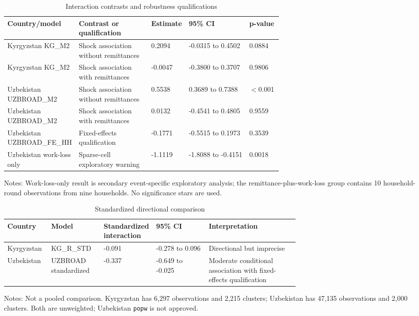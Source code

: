 \documentclass[11pt]{article}
\begin{document}
\begin{table}[!htbp]
\centering
\caption{Interaction contrasts and robustness qualifications}
\label{tab:contrasts}
\footnotesize
\setlength{\tabcolsep}{5pt}
\begin{tabularx}{\linewidth}{p{0.18\linewidth} X p{0.13\linewidth} p{0.22\linewidth} p{0.12\linewidth}}
\toprule
Country/model & Contrast or qualification & Estimate & 95\% CI & p-value \\
\midrule
Kyrgyzstan KG\_M2 & Shock association without remittances & 0.2094 & -0.0315 to 0.4502 & 0.0884 \\
Kyrgyzstan KG\_M2 & Shock association with remittances & -0.0047 & -0.3800 to 0.3707 & 0.9806 \\
Uzbekistan UZBROAD\_M2 & Shock association without remittances & 0.5538 & 0.3689 to 0.7388 & $<$0.001 \\
Uzbekistan UZBROAD\_M2 & Shock association with remittances & 0.0132 & -0.4541 to 0.4805 & 0.9559 \\
Uzbekistan UZBROAD\_FE\_HH & Fixed-effects qualification & -0.1771 & -0.5515 to 0.1973 & 0.3539 \\
Uzbekistan work-loss only & Sparse-cell exploratory warning & -1.1119 & -1.8088 to -0.4151 & 0.0018 \\
\bottomrule
\end{tabularx}
\begin{minipage}{0.95\linewidth}\footnotesize Notes: Work-loss-only result is secondary event-specific exploratory analysis; the remittance-plus-work-loss group contains 10 household-round observations from nine households. No significance stars are used.\end{minipage}
\end{table}

\begin{table}[!htbp]
\centering
\caption{Standardized directional comparison}
\label{tab:standardized}
\footnotesize
\begin{tabularx}{\linewidth}{p{0.15\linewidth} p{0.18\linewidth} p{0.18\linewidth} p{0.18\linewidth} X}
\toprule
Country & Model & Standardized interaction & 95\% CI & Interpretation \\
\midrule
Kyrgyzstan & KG\_R\_STD & -0.091 & -0.278 to 0.096 & Directional but imprecise \\
Uzbekistan & UZBROAD standardized & -0.337 & -0.649 to -0.025 & Moderate conditional association with fixed-effects qualification \\
\bottomrule
\end{tabularx}
\begin{minipage}{0.95\linewidth}\footnotesize Notes: Not a pooled comparison. Kyrgyzstan has 6,297 observations and 2,215 clusters; Uzbekistan has 47,135 observations and 2,000 clusters. Both are unweighted; Uzbekistan \texttt{popw} is not approved.\end{minipage}
\end{table}
\end{document}
